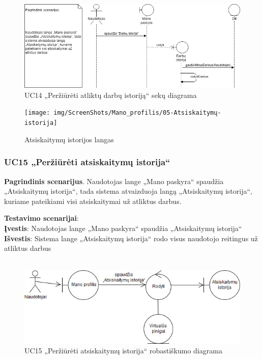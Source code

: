 \documentclass{VUMIFPSbakalaurinis}
\begin{document}
\begin{figure}[H]
	\centering
	\includegraphics[scale=0.6]{img/Sequence/SD14}
	\caption{UC14 „Peržiūrėti atliktų darbų istoriją“ sekų diagrama}
	\label{img:uc14seq}
\end{figure}

\begin{figure}[H]
	\centering
	\texttt{[image: img/ScreenShots/Mano\_profilis/05-Atsiskaitymų-istorija]}
	\caption{Atsiskaitymų istorijos langas}
	\label{img:payment history}
\end{figure}
\subsubsection{UC15 „Peržiūrėti atsiskaitymų istorija“}
\textbf{Pagrindinis scenarijus}. Naudotojas lange „Mano paskyra“ spaudžia „Atsiskaitymų istorija“, tada sistema atvaizduoja langą „Atsiskaitymų istorija“, kuriame pateikiami visi atsiskaitymai už atliktus darbus.
\par \textbf{Testavimo scenarijai}:\\
\textbf{Įvestis}: Naudotojas lange „Mano paskyra“ spaudžia „Atsiskaitymų istorija“\\
\textbf{Išvestis}: Sistema lange „Atsiskaitymų istorija“ rodo visus naudotojo reitingus už atliktus darbus\\ \\

\begin{figure}[H]
	\centering
	\includegraphics[scale=0.6]{img/Robustness/UC15}
	\caption{UC15 „Peržiūrėti atsiskaitymų istorija“ robastiškumo diagrama}
	\label{img:uc15rob}
\end{figure}
\end{document}
